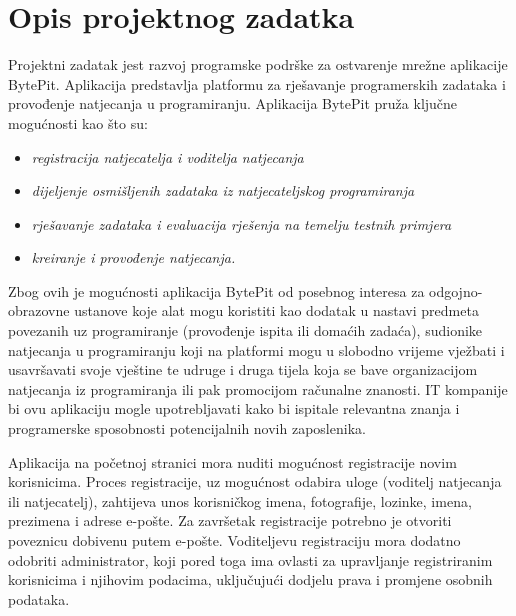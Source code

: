 \chapter{Opis projektnog zadatka}
			
		Projektni zadatak jest razvoj programske podrške za ostvarenje mrežne aplikacije BytePit. Aplikacija predstavlja platformu za rješavanje programerskih zadataka i provođenje natjecanja u programiranju. Aplikacija BytePit  pruža ključne mogućnosti kao što su:
		\begin{itemize}
			\item \textit{registracija natjecatelja i voditelja natjecanja}
			\item \textit{dijeljenje osmišljenih zadataka iz natjecateljskog programiranja}
			\item \textit{rješavanje zadataka i evaluacija rješenja na temelju testnih primjera}
			\item \textit{kreiranje i provođenje natjecanja.}
		\end{itemize}
		
		Zbog ovih je mogućnosti aplikacija BytePit od posebnog interesa za odgojno-obrazovne ustanove koje alat mogu koristiti kao dodatak u nastavi predmeta povezanih uz programiranje (provođenje ispita ili domaćih zadaća), sudionike natjecanja u programiranju koji na platformi mogu u slobodno vrijeme vježbati i usavršavati svoje vještine te udruge i druga tijela koja se bave organizacijom natjecanja iz programiranja ili pak promocijom računalne znanosti. IT kompanije bi ovu aplikaciju mogle upotrebljavati kako bi ispitale relevantna znanja i programerske sposobnosti potencijalnih novih zaposlenika.
		
		Aplikacija na početnoj stranici mora nuditi mogućnost registracije novim korisnicima. Proces registracije, uz mogućnost odabira uloge (voditelj natjecanja ili natjecatelj), zahtijeva unos korisničkog imena, fotografije, lozinke, imena, prezimena i adrese e-pošte. Za završetak registracije potrebno je otvoriti poveznicu dobivenu putem e-pošte. Voditeljevu registraciju mora dodatno odobriti administrator, koji pored toga ima ovlasti za upravljanje registriranim korisnicima i njihovim podacima, uključujući dodjelu prava i promjene osobnih podataka.
		
